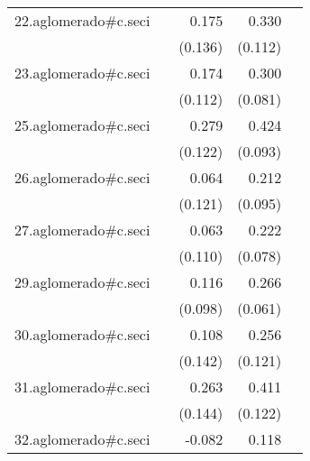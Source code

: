 {\begin{longtable}{l*{4}{D{.}{.}{-1}}}
\addlinespace
22.aglomerado#c.seci&                     &       0.175         &       0.330\sym{**} &                     \\
            &                     &     (0.136)         &     (0.112)         &                     \\
\addlinespace
23.aglomerado#c.seci&                     &       0.174         &       0.300\sym{***}&                     \\
            &                     &     (0.112)         &     (0.081)         &                     \\
\addlinespace
25.aglomerado#c.seci&                     &       0.279\sym{*}  &       0.424\sym{***}&                     \\
            &                     &     (0.122)         &     (0.093)         &                     \\
\addlinespace
26.aglomerado#c.seci&                     &       0.064         &       0.212\sym{*}  &                     \\
            &                     &     (0.121)         &     (0.095)         &                     \\
\addlinespace
27.aglomerado#c.seci&                     &       0.063         &       0.222\sym{**} &                     \\
            &                     &     (0.110)         &     (0.078)         &                     \\
\addlinespace
29.aglomerado#c.seci&                     &       0.116         &       0.266\sym{***}&                     \\
            &                     &     (0.098)         &     (0.061)         &                     \\
\addlinespace
30.aglomerado#c.seci&                     &       0.108         &       0.256\sym{*}  &                     \\
            &                     &     (0.142)         &     (0.121)         &                     \\
\addlinespace
31.aglomerado#c.seci&                     &       0.263         &       0.411\sym{***}&                     \\
            &                     &     (0.144)         &     (0.122)         &                     \\
\addlinespace
32.aglomerado#c.seci&                     &      -0.082         &       0.118         &                     \\

\end{longtable}}
